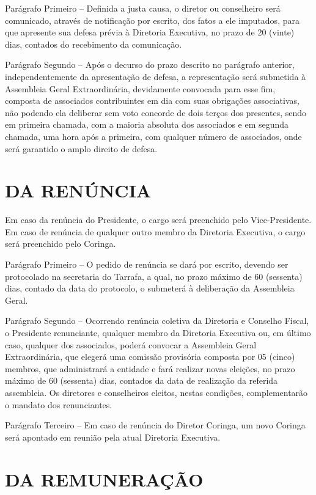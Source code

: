 \documentclass[a4paper]{report}
\begin{document}
Parágrafo Primeiro –
Definida a justa causa, o diretor ou conselheiro será comunicado, através de
notificação por escrito, dos fatos a ele imputados, para que apresente sua
defesa prévia à Diretoria Executiva, no prazo de 20 (vinte) dias, contados do
recebimento da comunicação.

Parágrafo Segundo –
Após o decurso do prazo descrito no parágrafo anterior, independentemente da
apresentação de defesa, a representação será submetida à Assembleia Geral
Extraordinária, devidamente convocada para esse fim, composta de associados
contribuintes em dia com suas obrigações associativas, não podendo ela deliberar
sem voto concorde de dois terços dos presentes, sendo em primeira
chamada, com a maioria absoluta dos associados e em segunda chamada, uma hora
após a primeira, com qualquer número de associados, onde será garantido o
amplo direito de defesa.

\section{DA RENÚNCIA}

Em caso da renúncia do Presidente, o cargo será preenchido pelo
Vice-Presidente.
Em caso de renúncia de qualquer outro membro da Diretoria Executiva,
o cargo será preenchido pelo Coringa.

Parágrafo Primeiro –
O pedido de renúncia se dará por escrito, devendo ser protocolado na
secretaria do Tarrafa, a qual, no prazo máximo de 60 (sessenta) dias,
contado da data do protocolo, o submeterá à deliberação da Assembleia Geral.

Parágrafo Segundo –
Ocorrendo renúncia coletiva da Diretoria e Conselho Fiscal, o Presidente
renunciante, qualquer membro da Diretoria Executiva ou, em último caso,
qualquer dos associados, poderá convocar a Assembleia Geral Extraordinária,
que elegerá uma comissão provisória composta por 05 (cinco) membros, que
administrará a entidade e fará realizar novas eleições, no prazo máximo
de 60 (sessenta) dias, contados da data de realização da referida assembleia.
Os diretores e conselheiros eleitos, nestas condições, complementarão o
mandato dos renunciantes.

Parágrafo Terceiro –
Em caso de renúncia do Diretor Coringa, um novo Coringa será apontado em
reunião pela atual Diretoria Executiva.

\section{DA REMUNERAÇÃO}
\end{document}
